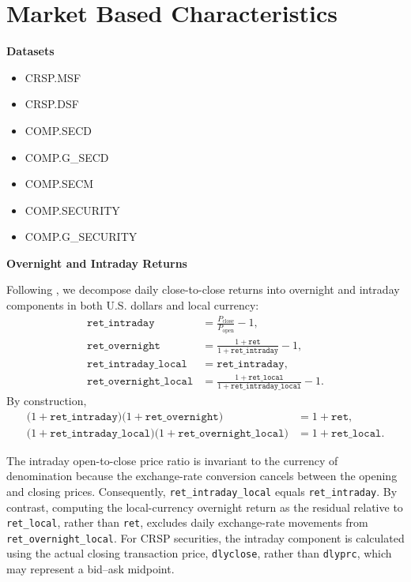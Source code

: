 \documentclass[12pt,title,fleqn]{article}
\begin{document}
\section{Market Based Characteristics}
\textbf{Datasets}
\begin{itemize}
	\item CRSP.MSF
	\item CRSP.DSF
	\item COMP.SECD
	\item COMP.G\_SECD
	\item COMP.SECM
	\item COMP.SECURITY
	\item COMP.G\_SECURITY
\end{itemize}

\noindent\textbf{Overnight and Intraday Returns}

Following , we decompose daily close-to-close returns into overnight and intraday components in both U.S. dollars and local currency:
\begin{align*}
    \texttt{ret\_intraday}
        &= \frac{P_{\mathrm{close}}}{P_{\mathrm{open}}} - 1, \\
    \texttt{ret\_overnight}
        &= \frac{1 + \texttt{ret}}
                {1 + \texttt{ret\_intraday}} - 1, \\
    \texttt{ret\_intraday\_local}
        &= \texttt{ret\_intraday}, \\
    \texttt{ret\_overnight\_local}
        &= \frac{1 + \texttt{ret\_local}}
                {1 + \texttt{ret\_intraday\_local}} - 1.
\end{align*}
By construction,
\begin{align*}
    \bigl(1 + \texttt{ret\_intraday}\bigr)
    \bigl(1 + \texttt{ret\_overnight}\bigr)
        &= 1 + \texttt{ret}, \\
    \bigl(1 + \texttt{ret\_intraday\_local}\bigr)
    \bigl(1 + \texttt{ret\_overnight\_local}\bigr)
        &= 1 + \texttt{ret\_local}.
\end{align*}

The intraday open-to-close price ratio is invariant to the currency of denomination because the exchange-rate conversion cancels between the opening and closing prices. Consequently, \texttt{ret\_intraday\_local} equals \texttt{ret\_intraday}. By contrast, computing the local-currency overnight return as the residual relative to \texttt{ret\_local}, rather than \texttt{ret}, excludes daily exchange-rate movements from \texttt{ret\_overnight\_local}. For CRSP securities, the intraday component is calculated using the actual closing transaction price, \texttt{dlyclose}, rather than \texttt{dlyprc}, which may represent a bid--ask midpoint.
\end{document}
